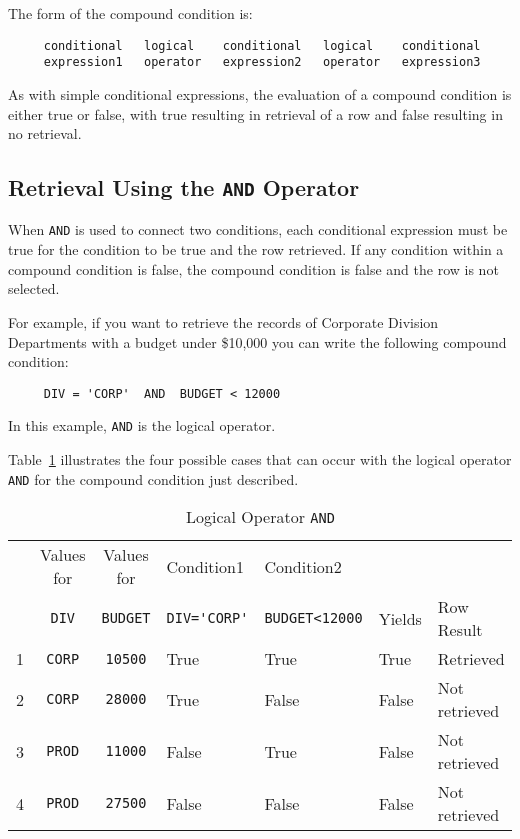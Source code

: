 The form of the compound condition is:
\begin{verbatim}
     conditional   logical    conditional   logical    conditional
     expression1   operator   expression2   operator   expression3
\end{verbatim}
As with simple conditional expressions, the evaluation of a compound
condition is either true or false, with true resulting in retrieval of
a row and false resulting in no retrieval.

\subsection{Retrieval Using the {\tt AND} Operator}

When {\tt AND} is used to connect two conditions, each conditional
expression must be true for the condition to be true and the row
retrieved.  If any condition within a compound condition is false, the
compound condition is false and the row is not selected.

For example, if you want to retrieve the records of Corporate Division
Departments with a budget under \$10,000 you can write the following
compound condition:
\begin{verbatim}
     DIV = 'CORP'  AND  BUDGET < 12000
\end{verbatim}
In this example, \verb`AND` is the logical operator.

Table~\ref{tab:LogAnd} illustrates the four possible cases that can
occur with the logical operator {\tt AND} for the compound condition just
described.

\begin{table}
\caption{Logical Operator {\tt AND}}{\label{tab:LogAnd}}
\begin{center}
\begin{tabular}{|lccllll|} \hline
  & Values for  & Values for    & Condition1        & Condition2          &        &               \\
  & \verb`DIV`  & \verb`BUDGET` & \verb`DIV='CORP'` & \verb`BUDGET<12000` & Yields & Row Result    \\ \hline\hline
1 & \verb`CORP` & \verb`10500`  & True              & True                & True   & Retrieved     \\
2 & \verb`CORP` & \verb`28000`  & True              & False               & False  & Not retrieved \\
3 & \verb`PROD` & \verb`11000`  & False             & True                & False  & Not retrieved \\
4 & \verb`PROD` & \verb`27500`  & False             & False               & False  & Not retrieved \\ \hline
\end{tabular}
\end{center}
\end{table}

